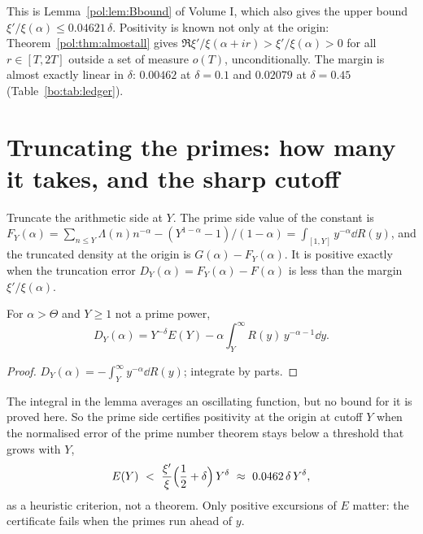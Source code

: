 This is Lemma~\ref{pol:lem:Bbound} of Volume I, which also gives the upper bound $\xi'/\xi(\alpha)\le0.04621\,\delta$. Positivity is known not only at the origin: Theorem~\ref{pol:thm:almostall} gives $\Re\xi'/\xi(\alpha+ir)>\xi'/\xi(\alpha)>0$ for all $r\in[T,2T]$ outside a set of measure $o(T)$, unconditionally. The margin is almost exactly linear in $\delta$: $0.00462$ at $\delta=0.1$ and $0.02079$ at $\delta=0.45$ (Table~\ref{bo:tab:ledger}).

\section{Truncating the primes: how many it takes, and the sharp cutoff}\label{bo:sec:sharp}

Truncate the arithmetic side at $Y$. The prime side value of the constant is $F_Y(\alpha)=\sum_{n\le Y}\Lambda(n)n^{-\alpha}-(Y^{1-\alpha}-1)/(1-\alpha)=\int_{[1,Y]}y^{-\alpha}\dd R(y)$, and the truncated density at the origin is $G(\alpha)-F_Y(\alpha)$. It is positive exactly when the truncation error $D_Y(\alpha)=F_Y(\alpha)-F(\alpha)$ is less than the margin $\xi'/\xi(\alpha)$.

\begin{lemma}\label{bo:lem:trunc}
For $\alpha>\Theta$ and $Y\ge1$ not a prime power,
\[
D_Y(\alpha)=Y^{-\delta}E(Y)-\alpha\int_Y^\infty R(y)\,y^{-\alpha-1}\dd y .
\]
\end{lemma}

\begin{proof}
$D_Y(\alpha)=-\int_Y^\infty y^{-\alpha}\dd R(y)$; integrate by parts.
\end{proof}

The integral in the lemma averages an oscillating function, but no bound for it is proved here. So the prime side certifies positivity at the origin at cutoff $Y$ when the normalised error of the prime number theorem stays below a threshold that grows with $Y$,
\begin{equation}\label{bo:eq:cert}
E(Y)\ <\ \frac{\xi'}{\xi}\Bigl(\frac12+\delta\Bigr)\,Y^{\delta}\ \approx\ 0.0462\,\delta\,Y^{\delta},
\end{equation}
as a heuristic criterion, not a theorem. Only positive excursions of $E$ matter: the certificate fails when the primes run ahead of $y$.

